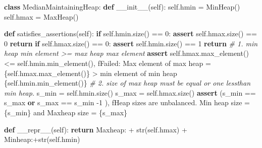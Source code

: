 \documentclass[
]{article}
\newenvironment{Shaded}{}{}
\newcommand{\BuiltInTok}[1]{\textcolor[rgb]{0.00,0.50,0.00}{#1}}
\newcommand{\CommentTok}[1]{\textcolor[rgb]{0.38,0.63,0.69}{\textit{#1}}}
\newcommand{\ControlFlowTok}[1]{\textcolor[rgb]{0.00,0.44,0.13}{\textbf{#1}}}
\newcommand{\DecValTok}[1]{\textcolor[rgb]{0.25,0.63,0.44}{#1}}
\newcommand{\FunctionTok}[1]{\textcolor[rgb]{0.02,0.16,0.49}{#1}}
\newcommand{\KeywordTok}[1]{\textcolor[rgb]{0.00,0.44,0.13}{\textbf{#1}}}
\newcommand{\NormalTok}[1]{#1}
\newcommand{\OperatorTok}[1]{\textcolor[rgb]{0.40,0.40,0.40}{#1}}
\newcommand{\SpecialCharTok}[1]{\textcolor[rgb]{0.25,0.44,0.63}{#1}}
\newcommand{\SpecialStringTok}[1]{\textcolor[rgb]{0.73,0.40,0.53}{#1}}
\newcommand{\StringTok}[1]{\textcolor[rgb]{0.25,0.44,0.63}{#1}}
\newcommand{\VariableTok}[1]{\textcolor[rgb]{0.10,0.09,0.49}{#1}}
\begin{document}
\begin{Shaded}
\begin{Highlighting}[]
\KeywordTok{class}\NormalTok{ MedianMaintainingHeap:}
    \KeywordTok{def} \FunctionTok{\_\_init\_\_}\NormalTok{(}\VariableTok{self}\NormalTok{):}
        \VariableTok{self}\NormalTok{.hmin }\OperatorTok{=}\NormalTok{ MinHeap()}
        \VariableTok{self}\NormalTok{.hmax }\OperatorTok{=}\NormalTok{ MaxHeap()}

    \KeywordTok{def}\NormalTok{ satisfies\_assertions(}\VariableTok{self}\NormalTok{):}
        \ControlFlowTok{if} \VariableTok{self}\NormalTok{.hmin.size() }\OperatorTok{==} \DecValTok{0}\NormalTok{:}
            \ControlFlowTok{assert} \VariableTok{self}\NormalTok{.hmax.size() }\OperatorTok{==} \DecValTok{0}
            \ControlFlowTok{return}
        \ControlFlowTok{if} \VariableTok{self}\NormalTok{.hmax.size() }\OperatorTok{==} \DecValTok{0}\NormalTok{:}
            \ControlFlowTok{assert} \VariableTok{self}\NormalTok{.hmin.size() }\OperatorTok{==} \DecValTok{1}
            \ControlFlowTok{return}
        \CommentTok{\# 1. min heap min element \textgreater{}= max heap max element}
        \ControlFlowTok{assert} \VariableTok{self}\NormalTok{.hmax.max\_element() }\OperatorTok{\textless{}=} \VariableTok{self}\NormalTok{.hmin.min\_element(), }\SpecialStringTok{f\textquotesingle{}Failed: Max element of max heap = }\SpecialCharTok{\{}\VariableTok{self}\SpecialCharTok{.}\NormalTok{hmax}\SpecialCharTok{.}\NormalTok{max\_element()}\SpecialCharTok{\}}\SpecialStringTok{ \textgreater{} min element of min heap }\SpecialCharTok{\{}\VariableTok{self}\SpecialCharTok{.}\NormalTok{hmin}\SpecialCharTok{.}\NormalTok{min\_element()}\SpecialCharTok{\}}\SpecialStringTok{\textquotesingle{}}
        \CommentTok{\# 2. size of max heap must be equal or one lessthan min heap.}
\NormalTok{        s\_min }\OperatorTok{=} \VariableTok{self}\NormalTok{.hmin.size()}
\NormalTok{        s\_max }\OperatorTok{=} \VariableTok{self}\NormalTok{.hmax.size()}
        \ControlFlowTok{assert}\NormalTok{ (s\_min }\OperatorTok{==}\NormalTok{ s\_max }\KeywordTok{or}\NormalTok{ s\_max  }\OperatorTok{==}\NormalTok{ s\_min }\OperatorTok{{-}}\DecValTok{1}\NormalTok{ ), }\SpecialStringTok{f\textquotesingle{}Heap sizes are unbalanced. Min heap size = }\SpecialCharTok{\{}\NormalTok{s\_min}\SpecialCharTok{\}}\SpecialStringTok{ and Maxheap size = }\SpecialCharTok{\{}\NormalTok{s\_max}\SpecialCharTok{\}}\SpecialStringTok{\textquotesingle{}}

    \KeywordTok{def} \FunctionTok{\_\_repr\_\_}\NormalTok{(}\VariableTok{self}\NormalTok{):}
        \ControlFlowTok{return} \StringTok{\textquotesingle{}Maxheap:\textquotesingle{}} \OperatorTok{+} \BuiltInTok{str}\NormalTok{(}\VariableTok{self}\NormalTok{.hmax) }\OperatorTok{+} \StringTok{\textquotesingle{} Minheap:\textquotesingle{}}\OperatorTok{+}\BuiltInTok{str}\NormalTok{(}\VariableTok{self}\NormalTok{.hmin)}


\end{Highlighting}
\end{Shaded}
\end{document}
